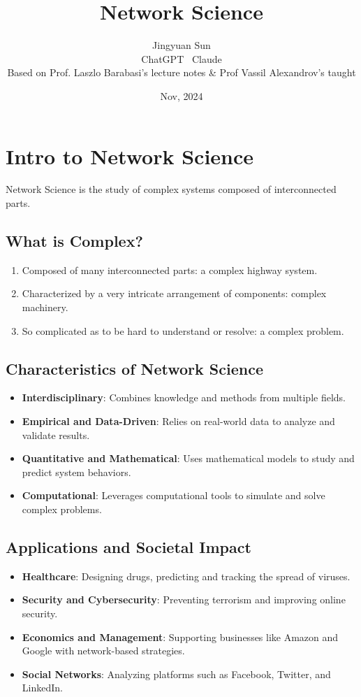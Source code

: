 \documentclass{article}
\title{\textbf{Network Science}}
\author{Jingyuan Sun \\ ChatGPT \ Claude \\ Based on Prof. Laszlo Barabasi's lecture notes & Prof Vassil Alexandrov's taught}
\date{Nov, 2024}
\begin{document}
\maketitle

\section{Intro to Network Science}
Network Science is the study of complex systems composed of interconnected parts.

\subsection{What is Complex?}
\begin{enumerate}
    \item Composed of many interconnected parts: a complex highway system.
    \item Characterized by a very intricate arrangement of components: complex machinery.
    \item So complicated as to be hard to understand or resolve: a complex problem.
\end{enumerate}

\subsection{Characteristics of Network Science}

\begin{itemize}
    \item \textbf{Interdisciplinary}: Combines knowledge and methods from multiple fields.
    \item \textbf{Empirical and Data-Driven}: Relies on real-world data to analyze and validate results.
    \item \textbf{Quantitative and Mathematical}: Uses mathematical models to study and predict system behaviors.
    \item \textbf{Computational}: Leverages computational tools to simulate and solve complex problems.
\end{itemize}

\subsection{Applications and Societal Impact}

\begin{itemize}
    \item \textbf{Healthcare}: Designing drugs, predicting and tracking the spread of viruses.
    \item \textbf{Security and Cybersecurity}: Preventing terrorism and improving online security.
    \item \textbf{Economics and Management}: Supporting businesses like Amazon and Google with network-based strategies.
    \item \textbf{Social Networks}: Analyzing platforms such as Facebook, Twitter, and LinkedIn.
\end{itemize}
\end{document}
